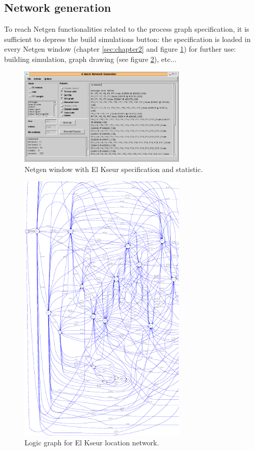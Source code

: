 \subsection{Network generation}

To reach Netgen functionalities related to the process graph specification, 
it is sufficient to depress the build simulations button: the specification is 
loaded in every Netgen window (chapter \ref{sec:chapter2} and figure \ref{fig:soummamNetgen})  
for further use: building simulation, graph drawing (see figure \ref{fig:soummamGraph}), etc... 


\begin{figure}
\begin{center}
\includegraphics[width=8cm]{netgenSoummam.png}
\caption{Netgen window with El Kseur specification and statistic. }
\label{fig:soummamNetgen}
\end{center}
\end{figure}

\begin{figure}
\begin{center}
\includegraphics[width=8cm]{soummam2.pdf}
\caption{Logic graph for El Kseur location network.}
\label{fig:soummamGraph}
\end{center}
\end{figure}



